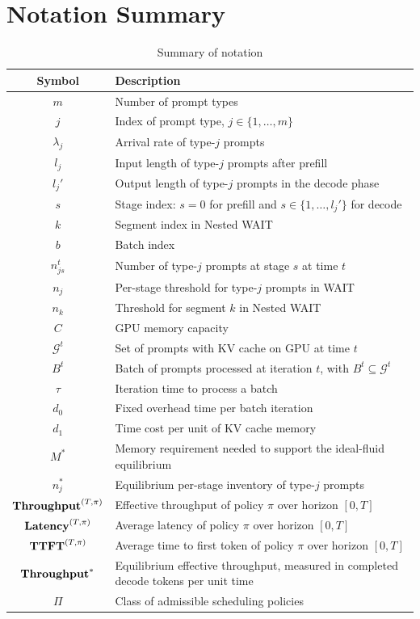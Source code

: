 \section{Notation Summary}
\label{app:notation}

\begin{table}[htbp]
\centering
\caption{Summary of notation}
\label{tab:notation}
\small
\begin{tabular}{cl}
\toprule
\textbf{Symbol} & \textbf{Description} \\
\midrule
$m$ & Number of prompt types \\
$j$ & Index of prompt type, $j \in \{1, \dots, m\}$ \\
$\lambda_j$ & Arrival rate of type-$j$ prompts \\
$l_j$ & Input length of type-$j$ prompts after prefill \\
$l_j'$ & Output length of type-$j$ prompts in the decode phase \\
$s$ & Stage index: $s=0$ for prefill and $s \in \{1, \dots, l_j'\}$ for decode \\
$k$ & Segment index in Nested WAIT \\
$b$ & Batch index \\
$n_{js}^t$ & Number of type-$j$ prompts at stage $s$ at time $t$ \\
$n_j$ & Per-stage threshold for type-$j$ prompts in WAIT \\
$n_k$ & Threshold for segment $k$ in Nested WAIT \\
\midrule
$C$ & GPU memory capacity \\
$\mathcal{G}^t$ & Set of prompts with KV cache on GPU at time $t$ \\
$B^t$ & Batch of prompts processed at iteration $t$, with $B^t \subseteq \mathcal{G}^t$ \\
$\tau$ & Iteration time to process a batch \\
$d_0$ & Fixed overhead time per batch iteration \\
$d_1$ & Time cost per unit of KV cache memory \\
\midrule
$M^*$ & Memory requirement needed to support the ideal-fluid equilibrium \\
$n_j^*$ & Equilibrium per-stage inventory of type-$j$ prompts \\
$\textbf{Throughput}^{(T,\pi)}$ & Effective throughput of policy $\pi$ over horizon $[0,T]$ \\
$\textbf{Latency}^{(T,\pi)}$ & Average latency of policy $\pi$ over horizon $[0,T]$ \\
$\textbf{TTFT}^{(T,\pi)}$ & Average time to first token of policy $\pi$ over horizon $[0,T]$ \\
$\textbf{Throughput}^*$ & Equilibrium effective throughput, measured in completed decode tokens per unit time \\
$\Pi$ & Class of admissible scheduling policies \\
\bottomrule
\end{tabular}
\end{table}
